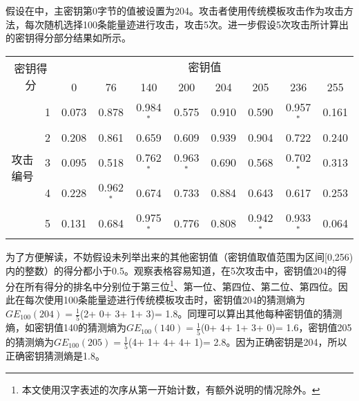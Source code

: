 {	\begin{example}\label{ex:badge}
		假设在中，主密钥第0字节的值被设置为204。攻击者使用传统模板攻击作为攻击方法，每次随机选择100条能量迹进行攻击，攻击5次。进一步假设5次攻击所计算出的密钥得分部分结果如所示。
		
		\begin{table}[!h]
			\label{tab:scoredemo}
			\centering
			\small{
				\begin{tabular}{cccccccccc}
					\hline
					\multicolumn{2}{c}{\multirow{2}{*}{密钥得分}} & \multicolumn{8}{c}{密钥值} \\
					\multicolumn{2}{c}{}
					    &     0 &    76 &   140 &   200 &    204 &   205 &   236 &   255\\
					\hline
					\multirow{5}{*}{攻击编号} 
					& 1 & 0.073 & 0.878 & 0.984$^*$ & 0.575 & 0.910 & 0.590 & 0.957$^*$ & 0.161\\
					
					& 2 & 0.208 & 0.861 & 0.659 & 0.609 & 0.939 & 0.904 & 0.722 & 0.240\\
					
					& 3 & 0.095 & 0.518 & 0.762$^*$ & 0.963$^*$ & 0.690 & 0.568 & 0.702$^*$ & 0.313\\
					
					& 4 & 0.228 & 0.962$^*$ & 0.674 & 0.733 & 0.884 & 0.643 & 0.617 & 0.253\\
					
					& 5 & 0.131 & 0.684 & 0.975$^*$ & 0.776 & 0.808 & 0.942$^*$ & 0.933$^*$ & 0.064\\
					
					\hline
				\end{tabular}
			}
		\end{table}
	
		为了方便解读，不妨假设未列举出来的其他密钥值（密钥值取值范围为区间[0,256)内的整数）的得分都小于0.5。观察表格容易知道，在5次攻击中，密钥值204的得分在所有得分的排名中分别位于第三位\footnote{本文使用汉字表述的次序从第一开始计数，有额外说明的情况除外。}、第一位、第四位、第二位、第四位。因此在每次使用100条能量迹进行传统模板攻击时，密钥值204的猜测熵为$GE_{100}(204)=\frac15$(2+ 0+ 3+ 1+ 3)= 1.8。同理可以算出其他每种密钥值的猜测熵，如密钥值140的猜测熵为$GE_{100}(140)=\frac15$(0+ 4+ 1+ 3+ 0)= 1.6，密钥值205的猜测熵为$GE_{100}(205)=\frac15$(4+ 1+ 4+ 4+ 1)= 2.8。因为正确密钥是204，所以正确密钥猜测熵是1.8。
	\end{example}
}
